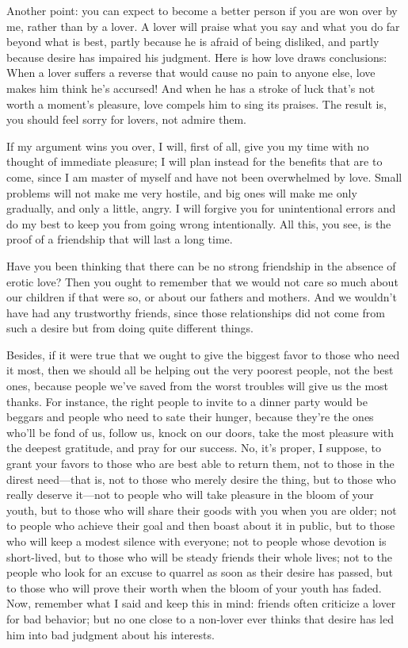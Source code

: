 Another point: you can expect to become a better person if you are won
over by me, rather than by a lover. A lover will praise what you say and
what you do far beyond what is best, partly because he is afraid of 
being disliked, and partly because desire has impaired his
judgment. Here is how love draws conclusions: When a lover suffers a
reverse that would cause no pain to anyone else, love makes him think
he's accursed! And when he has a stroke of luck that's not worth a
moment's pleasure, love compels him to sing its praises. The result is,
you should feel sorry for lovers, not admire them.

If my argument wins you over, I will, first of all, give you my time
with no thought of immediate pleasure; I will plan instead for the
benefits that are to come, since I am master of myself and have
not been overwhelmed by love. Small problems will not make me very
hostile, and big ones will make me only gradually, and only a little,
angry. I will forgive you for unintentional errors and do my best to
keep you from going wrong intentionally. All this, you see, is the proof
of a friendship that will last a long time.

Have you been thinking that there can be no strong friendship in the
absence of erotic love? Then you ought to remember that we would not 
care so much about our children if that were so, or about our
fathers and mothers. And we wouldn't have had any trustworthy friends,
since those relationships did not come from such a desire but from doing
quite different things.

Besides, if it were true that we ought to give the biggest favor to
those who need it most, then we should all be helping out the very
poorest people, not the best ones, because people we've saved from the
worst troubles will give us the most thanks. For instance, the right
people to invite to a dinner party would be beggars and people
who need to sate their hunger, because they're the ones who'll be fond
of us, follow us, knock on our
doors, take the most
pleasure with the deepest gratitude, and pray for our success. No, it's
proper, I suppose, to grant your favors to those who are best able to
return them, not to those in the direst need---that is, not to those who
merely desire the thing, but to those who really deserve
it---not to people who will take pleasure in the bloom of your youth,
but to those who will share their goods with you when you are older; not
to people who achieve their goal and then boast about it in public, but
to those who will keep a modest silence with everyone; not to people
whose devotion is short-lived, but to those who will be steady friends
their whole lives; not to the people who look for an excuse to quarrel
as soon as their desire has passed, but to those who will prove 
their worth when the bloom of your youth has faded. Now, remember what I
said and keep this in mind: friends often criticize a lover for bad
behavior; but no one close to a non-lover ever thinks that desire has
led him into bad judgment about his interests.

